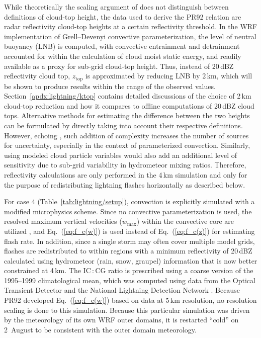 While theoretically the scaling argument of \citet{Vonnegut:1963aa} does not
distinguish between definitions of cloud-top height, the data used to derive
the PR92 relation are radar reflectivity cloud-top heights at a certain
reflectivity threshold. In the WRF implementation of Grell--Devenyi convective
parameterization, the level of neutral buoyancy (LNB) is computed, with
convective entrainment and detrainment accounted for within the calculation
of cloud moist static energy, and readily available as a proxy for sub-grid
cloud-top height. Thus, instead of 20\,\unit{dBZ} reflectivity cloud top,
$z_{\mathrm{top}}$ is approximated by reducing LNB by 2\,\unit{km}, which
will be shown to produce results within the range of the observed values.
Section~\ref{apdx:lightning/ktop}
contains detailed discussions of the choice of 2\,\unit{km}
cloud-top reduction and how it compares to offline computations of
20\,\unit{dBZ} cloud tops. Alternative methods for estimating the difference
between the two heights can be formulated by directly taking into account
their respective definitions. However, echoing \cite{Barthe:2010uq}, such
addition of complexity increases the number of sources for uncertainty,
especially in the context of parameterized convection. Similarly, using
modeled cloud particle variables would also add an additional level of
sensitivity due to sub-grid variability in hydrometeor mixing ratios.
Therefore, reflectivity calculations are only performed in the 4\,\unit{km}
simulation and only for the purpose of redistributing lightning flashes
horizontally as described below.

For case 4 (Table~\ref{tab:lightning/setup}), convection is explicitly simulated with a
modified \citet{Lin:1983zr} microphysics scheme. Since no convective
parameterization is used, the resolved maximum vertical velocities
($w_{\max}$) within the convective core are utilized \citep{Barth:2012qf},
and Eq.~(\ref{eq:f_c(w)}) is used instead of Eq.~(\ref{eq:f_c(z)}) for
estimating flash rate. In addition, since a single storm may often cover
multiple model grids, flashes are redistributed to within regions with a
minimum reflectivity of 20\,\unit{dBZ} calculated using hydrometeor (rain,
snow, graupel) information that is now better constrained at 4\,\unit{km}.
The IC\,:\,CG ratio is prescribed using a coarse version of the
\cite{Boccippio:2001ys} 1995--1999 climatological mean, which was computed
using data from the Optical Transient Detector
\citep[OTD;][]{Boccippio:2000mi} and the National Lightning Detection Network
\citep[NLDN;][]{Cummins:2009aa}. Because PR92 developed Eq.~(\ref{eq:f_c(w)}) based
on data at 5\,\unit{km} resolution, no resolution scaling is done to this
simulation. Because this particular simulation was driven by the meteorology
of its own WRF outer domains, it is restarted ``cold'' on 2~August to be
consistent with the outer domain meteorology.

